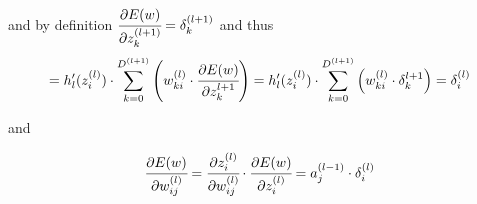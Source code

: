 \documentclass[12pt,a4paper]{report}
\begin{document}
and by definition $\cfrac{\partial E(w)}{\partial z_{k}^{(l+1)}} = \delta_{k}^{(l+1)}$ and thus
\setcounter{equation}{0}
\begin{align*}
=  h'_{l}(z_{i}^{(l)}) \cdot \sum_{k=0}^{D^{(l+1)}} \left(w_{ki}^{(l)} \cdot \cfrac{\partial E(w)}{\partial z_{k}^{l+1}}\right)  
=  h'_{l}(z_{i}^{(l)}) \cdot \sum_{k=0}^{D^{(l+1)}} \left(w_{ki}^{(l)} \cdot \delta_{k}^{l+1}\right) = \delta_{i}^{(l)} 
\end{align*}

and

\setcounter{equation}{0}
\begin{align*}
\cfrac{\partial E(w)^{}}{\partial w_{ij}^{(l)}} = \cfrac{\partial z_{i}^{(l)}}{\partial w_{ij}^{(l)}} \cdot \cfrac{\partial E(w) }{\partial z_{i}^{(l)}} = a_{j}^{(l-1)} \cdot \delta_{i}^{(l)}
\end{align*}
\end{document}
